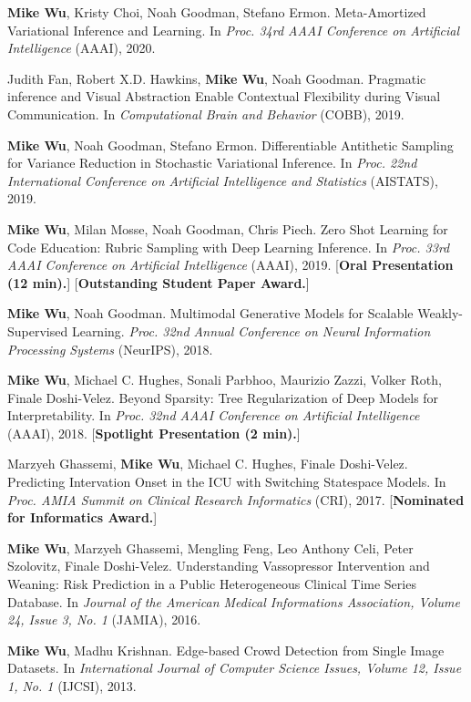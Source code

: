 \documentclass[margin, 10pt]{res} %
\begin{document}
\begin{resume}
\textbf{Mike Wu}, Kristy Choi, Noah Goodman, Stefano Ermon. Meta-Amortized Variational Inference and Learning. In \textit{Proc. 34rd AAAI Conference on Artificial Intelligence} (AAAI), 2020.

Judith Fan, Robert X.D. Hawkins, \textbf{Mike Wu}, Noah Goodman. Pragmatic inference and Visual Abstraction Enable Contextual Flexibility during Visual Communication. In \textit{Computational Brain and Behavior} (COBB), 2019.

\textbf{Mike Wu}, Noah Goodman, Stefano Ermon. Differentiable Antithetic Sampling for Variance Reduction in Stochastic Variational Inference. In \textit{Proc. 22nd International Conference on Artificial Intelligence and Statistics} (AISTATS), 2019.

\textbf{Mike Wu}, Milan Mosse, Noah Goodman, Chris Piech. Zero Shot Learning for Code Education: Rubric Sampling with Deep Learning Inference. In \textit{Proc. 33rd AAAI Conference on Artificial Intelligence} (AAAI), 2019. [\textbf{Oral Presentation (12 min).}] [\textbf{Outstanding Student Paper Award.}]

\textbf{Mike Wu}, Noah Goodman. Multimodal Generative Models for Scalable Weakly-Supervised Learning. \textit{Proc. 32nd Annual Conference on Neural Information Processing Systems} (NeurIPS), 2018.

\textbf{Mike Wu}, Michael C. Hughes, Sonali Parbhoo, Maurizio Zazzi, Volker Roth, Finale Doshi-Velez. Beyond Sparsity: Tree Regularization of Deep Models for Interpretability. In \textit{Proc. 32nd AAAI Conference on Artificial Intelligence} (AAAI), 2018. [\textbf{Spotlight Presentation (2 min).}]

Marzyeh Ghassemi, \textbf{Mike Wu}, Michael C. Hughes, Finale Doshi-Velez. Predicting Intervation Onset in the ICU with Switching Statespace Models. In \textit{Proc. AMIA Summit on Clinical Research Informatics} (CRI), 2017. [\textbf{Nominated for Informatics Award.}]

\textbf{Mike Wu}, Marzyeh Ghassemi, Mengling Feng, Leo Anthony Celi, Peter Szolovitz, Finale Doshi-Velez. Understanding Vassopressor Intervention and Weaning: Risk Prediction in a Public Heterogeneous Clinical Time Series Database. In \textit{Journal of the American Medical Informations Association, Volume 24, Issue 3, No. 1} (JAMIA), 2016.

\textbf{Mike Wu}, Madhu Krishnan. Edge-based Crowd Detection from Single Image Datasets. In \textit{International Journal of Computer Science Issues, Volume 12, Issue 1, No. 1} (IJCSI), 2013.


\end{resume}
\end{document}
